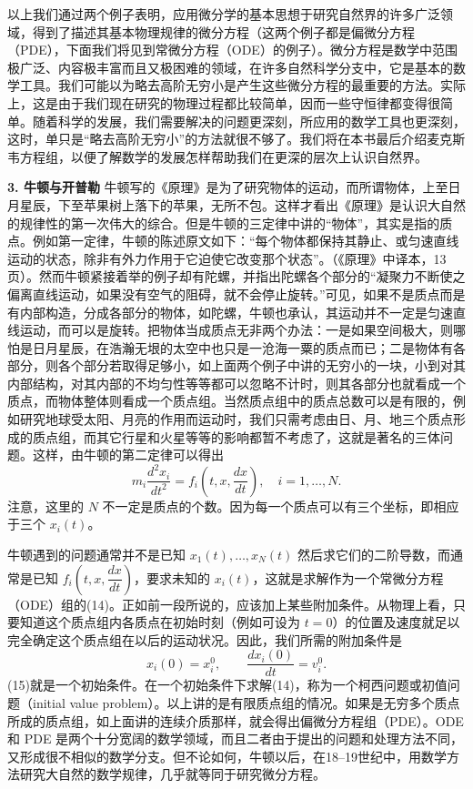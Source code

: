 \enlargethispage{1.5\baselineskip}
以上我们通过两个例子表明，应用微分学的基本思想于研究自然界的许多广泛领域，得到了描述其基本物理规律的微分方程（这两个例子都是偏微分方程（PDE），下面我们将见到常微分方程（ODE）的例子）。微分方程是数学中范围极广泛、内容极丰富而且又极困难的领域，在许多自然科学分支中，它是基本的数学工具。我们可能以为略去高阶无穷小是产生这些微分方程的最重要的方法。实际上，这是由于我们现在研究的物理过程都比较简单，因而一些守恒律都变得很简单。随着科学的发展，我们需要解决的问题更深刻，所应用的数学工具也更深刻，这时，单只是“略去高阶无穷小”的方法就很不够了。我们将在本书最后介绍麦克斯韦方程组，以便了解数学的发展怎样帮助我们在更深的层次上认识自然界。

\medskip
\noindent\textbf{3. 牛顿与开普勒}\quad
牛顿写的《原理》是为了研究物体的运动，而所谓物体，上至日月星辰，下至苹果树上落下的苹果，无所不包。这样才看出《原理》是认识大自然的规律性的第一次伟大的综合。但是牛顿的三定律中讲的“物体”，其实是指的质点。例如第一定律，牛顿的陈述原文如下：“每个物体都保持其静止、或匀速直线运动的状态，除非有外力作用于它迫使它改变那个状态”。（《原理》中译本，13页）。然而牛顿紧接着举的例子却有陀螺，并指出陀螺各个部分的“凝聚力不断使之偏离直线运动，如果没有空气的阻碍，就不会停止旋转。”可见，如果不是质点而是有内部构造，分成各部分的物体，如陀螺，牛顿也承认，其运动并不一定是匀速直线运动，而可以是旋转。把物体当成质点无非两个办法：一是如果空间极大，则哪怕是日月星辰，在浩瀚无垠的太空中也只是一沧海一粟的质点而已；二是物体有各部分，则各个部分若取得足够小，如上面两个例子中讲的无穷小的一块，小到对其内部结构，对其内部的不均匀性等等都可以忽略不计时，则其各部分也就看成一个质点，而物体整体则看成一个质点组。当然质点组中的质点总数可以是有限的，例如研究地球受太阳、月亮的作用而运动时，我们只需考虑由日、月、地三个质点形成的质点组，而其它行星和火星等等的影响都暂不考虑了，这就是著名的三体问题。这样，由牛顿的第二定律可以得出
\begin{equation}
 m_i\frac{d^2x_i}{dt^2}=f_i\left(t,x,\frac{dx}{dt}\right),\quad i=1,\ldots,N.
 \tag{14}
\end{equation}
注意，这里的 $N$ 不一定是质点的个数。因为每一个质点可以有三个坐标，即相应于三个 $x_i(t)$。

牛顿遇到的问题通常并不是已知 $x_1(t),\ldots,x_N(t)$ 然后求它们的二阶导数，而通常是已知 $f_i\left(t,x,\dfrac{dx}{dt}\right)$，要求未知的 $x_i(t)$，这就是求解作为一个常微分方程（ODE）组的(14)。正如前一段所说的，应该加上某些附加条件。从物理上看，只要知道这个质点组内各质点在初始时刻（例如可设为 $t=0$）的位置及速度就足以完全确定这个质点组在以后的运动状况。因此，我们所需的附加条件是
\begin{equation}
 x_i(0)=x_i^0,\qquad \frac{dx_i(0)}{dt}=v_i^0.
 \tag{15}
\end{equation}
(15)就是一个初始条件。在一个初始条件下求解(14)，称为一个柯西问题或初值问题（initial value problem）。以上讲的是有限质点组的情况。如果是无穷多个质点所成的质点组，如上面讲的连续介质那样，就会得出偏微分方程组（PDE）。ODE 和 PDE 是两个十分宽阔的数学领域，而且二者由于提出的问题和处理方法不同，又形成很不相似的数学分支。但不论如何，牛顿以后，在18--19世纪中，用数学方法研究大自然的数学规律，几乎就等同于研究微分方程。

